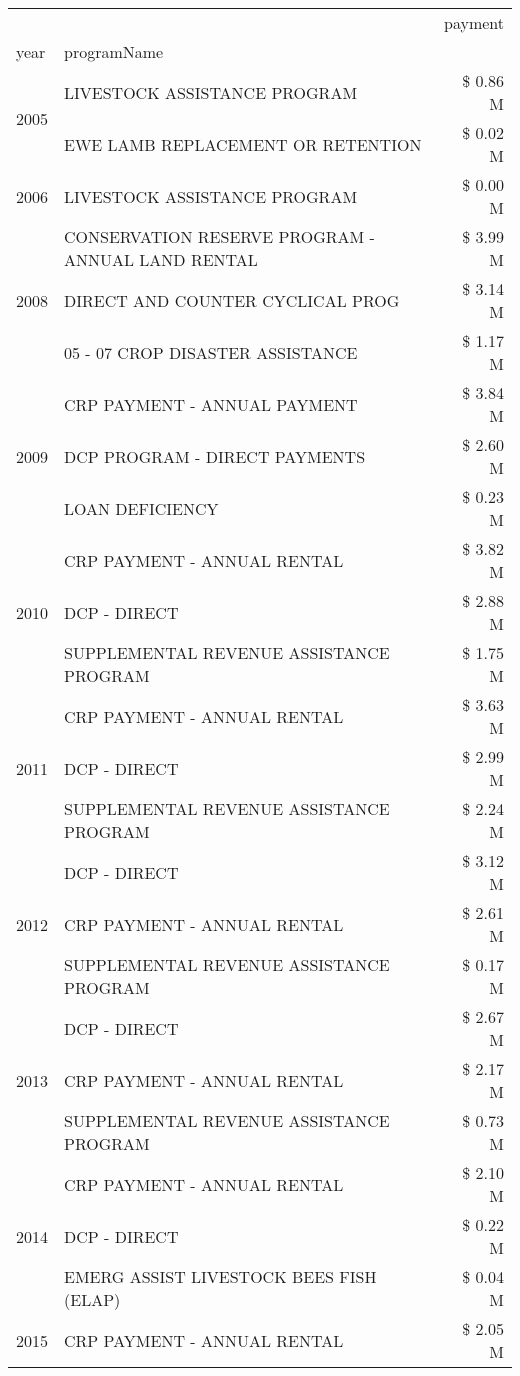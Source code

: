 \begin{tabular}{llr}
\toprule
 &  & payment \\
year & programName &  \\
\midrule
\multirow[t]{2}{*}{2005} & LIVESTOCK ASSISTANCE PROGRAM & \$ 0.86 M \\
 & EWE LAMB REPLACEMENT OR RETENTION & \$ 0.02 M \\
\cline{1-3}
2006 & LIVESTOCK ASSISTANCE PROGRAM & \$ 0.00 M \\
\cline{1-3}
\multirow[t]{3}{*}{2008} & CONSERVATION RESERVE PROGRAM - ANNUAL LAND RENTAL & \$ 3.99 M \\
 & DIRECT AND COUNTER CYCLICAL PROG & \$ 3.14 M \\
 & 05 - 07 CROP DISASTER ASSISTANCE & \$ 1.17 M \\
\cline{1-3}
\multirow[t]{3}{*}{2009} & CRP PAYMENT - ANNUAL PAYMENT & \$ 3.84 M \\
 & DCP PROGRAM - DIRECT PAYMENTS & \$ 2.60 M \\
 & LOAN DEFICIENCY & \$ 0.23 M \\
\cline{1-3}
\multirow[t]{3}{*}{2010} & CRP PAYMENT - ANNUAL RENTAL & \$ 3.82 M \\
 & DCP - DIRECT & \$ 2.88 M \\
 & SUPPLEMENTAL REVENUE ASSISTANCE PROGRAM & \$ 1.75 M \\
\cline{1-3}
\multirow[t]{3}{*}{2011} & CRP PAYMENT - ANNUAL RENTAL & \$ 3.63 M \\
 & DCP - DIRECT & \$ 2.99 M \\
 & SUPPLEMENTAL REVENUE ASSISTANCE PROGRAM & \$ 2.24 M \\
\cline{1-3}
\multirow[t]{3}{*}{2012} & DCP - DIRECT & \$ 3.12 M \\
 & CRP PAYMENT - ANNUAL RENTAL & \$ 2.61 M \\
 & SUPPLEMENTAL REVENUE ASSISTANCE PROGRAM & \$ 0.17 M \\
\cline{1-3}
\multirow[t]{3}{*}{2013} & DCP - DIRECT & \$ 2.67 M \\
 & CRP PAYMENT - ANNUAL RENTAL & \$ 2.17 M \\
 & SUPPLEMENTAL REVENUE ASSISTANCE PROGRAM & \$ 0.73 M \\
\cline{1-3}
\multirow[t]{3}{*}{2014} & CRP PAYMENT - ANNUAL RENTAL & \$ 2.10 M \\
 & DCP - DIRECT & \$ 0.22 M \\
 & EMERG ASSIST LIVESTOCK BEES FISH (ELAP) & \$ 0.04 M \\
\cline{1-3}
\multirow[t]{3}{*}{2015} & CRP PAYMENT - ANNUAL RENTAL & \$ 2.05 M \\

\end{tabular}
